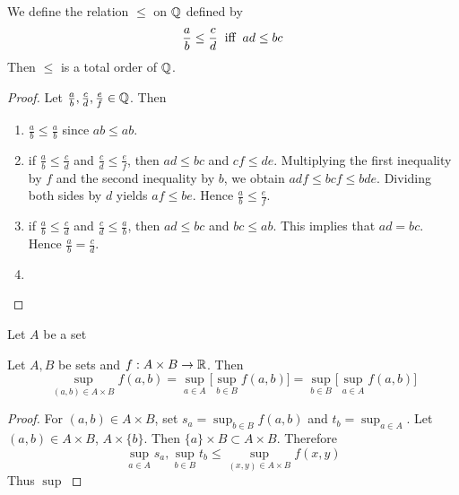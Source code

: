 \documentclass{book}
\begin{document}
	\begin{ex} \lex{}
		We define the relation $\leq$ on $\mathbb{Q}$ defined by $$\frac{a}{b} \leq \frac{c}{d} \hspace{.2cm} \text{iff} \hspace{.2cm} ad \leq bc$$ Then $\leq$ is a total order of $\mathbb{Q}$.
	\end{ex}

	\begin{proof} Let $\frac{a}{b}, \frac{c}{d}, \frac{e}{f} \in \mathbb{Q}$. Then
		\begin{enumerate}
			\item  $\frac{a}{b} \leq \frac{a}{b}$ since $ab \leq ab$. 
			\item if $\frac{a}{b} \leq \frac{c}{d}$ and $\frac{c}{d} \leq  \frac{e}{f}$, then $ad \leq bc$ and $ cf \leq de$. Multiplying the first inequality by $f$ and the second inequality by $b$, we obtain $adf \leq bcf \leq bde$. Dividing both sides by $d$ yields $af \leq be$. Hence $\frac{a}{b} \leq \frac{e}{f}$. 
			\item if $\frac{a}{b} \leq \frac{c}{d}$ and $\frac{c}{d} \leq \frac{a}{b}$, then $ad \leq bc$ and $bc \leq ab$. This implies that $ad = bc$. Hence $\frac{a}{b} = \frac{c}{d}$.
			\item 
		\end{enumerate}
	\end{proof}
	
	
	\begin{defn}
		Let $A$ be a set
	\end{defn}
	
	\begin{ex}
		Let $A,B$ be sets and $f:A \times B \rightarrow \mathbb{R}$. Then 
		$$\sup_{(a,b) \in A \times B} f(a,b) = \sup_{a \in A} \bigg[ \sup_{b \in B} f(a,b) \bigg] =  \sup_{b \in B} \bigg[ \sup_{a \in A} f(a,b) \bigg]$$
	\end{ex}

	\begin{proof}
		For $(a,b) \in A \times B$, set $s_a = \sup_{b \in B} f(a,b)$ and $t_b = \sup_{a \in A}$. Let $(a,b) \in A \times B$, $A \times \{b\}$. Then $\{a\} \times B \subset A \times B$. Therefore 
		$$\sup_{a \in A} s_a, \sup_{b \in B} t_b \leq \sup_{(x,y) \in A \times B} f(x,y)$$
		Thus $\sup_{}$
	\end{proof}
	
	
	
	
	
	
	
	
	
	
	
\end{document}

